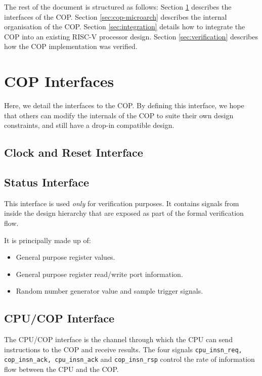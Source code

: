 \documentclass{article}
\begin{document}
The rest of the document is structured as follows: Section 
\ref{sec:cop-interfaces} describes the interfaces of the COP. Section
\ref{sec:cop-microarch} describes the internal organisation of the COP.
Section \ref{sec:integration} details how to integrate the COP into an
existing RISC-V processor design. Section \ref{sec:verification} describes
how the COP implementation was verified.

\section{COP Interfaces}
\label{sec:cop-interfaces}

Here, we detail the interfaces to the COP. By defining this interface, we
hope that others can modify the internals of the COP to suite their own
design constraints, and still have a drop-in compatible design.

\subsection{Clock and Reset Interface}
\label{sec:if-clk-reset}


\subsection{Status Interface}

This interface is used {\em only} for verification purposes. It contains
signals from inside the design hierarchy that are exposed as part of the
formal verification flow.

It is principally made up of:

\begin{itemize}
\item General purpose register values.
\item General purpose register read/write port information.
\item Random number generator value and sample trigger signals.
\end{itemize}

\subsection{CPU/COP Interface}
\label{sec:cpu-cop-if}

The CPU/COP interface is the channel through which the CPU can send
instructions to the COP and receive results.
The four signals
{\tt cpu\_insn\_req, cop\_insn\_ack, cpu\_insn\_ack} and
{\tt cop\_insn\_rsp}
control the rate of information flow between the CPU and the COP.
\end{document}
